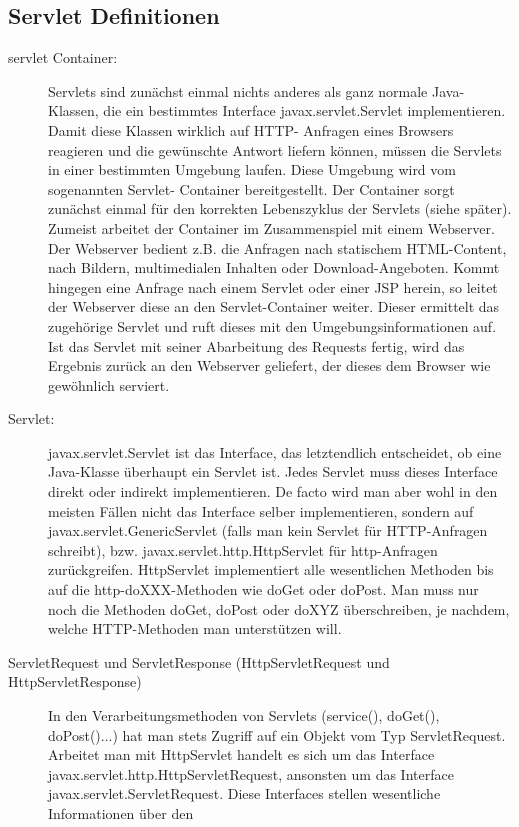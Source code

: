 \documentclass[a4paper,10pt]{scrreprt}
\begin{document}
\subsection{Servlet Definitionen}

\begin{description}
\item [servlet Container:] Servlets sind zunächst einmal nichts anderes als ganz normale Java-Klassen, die ein bestimmtes
Interface javax.servlet.Servlet implementieren. Damit diese Klassen wirklich auf HTTP-
Anfragen eines Browsers reagieren und die gewünschte Antwort liefern können, müssen die
Servlets in einer bestimmten Umgebung laufen. Diese Umgebung wird vom sogenannten Servlet-
Container bereitgestellt.
Der Container sorgt zunächst einmal für den korrekten Lebenszyklus der Servlets (siehe später).
Zumeist arbeitet der Container im Zusammenspiel mit einem Webserver. Der Webserver bedient
z.B. die Anfragen nach statischem HTML-Content, nach Bildern, multimedialen Inhalten oder
Download-Angeboten. Kommt hingegen eine Anfrage nach einem Servlet oder einer JSP herein, so
leitet der Webserver diese an den Servlet-Container weiter. Dieser ermittelt das zugehörige Servlet
und ruft dieses mit den Umgebungsinformationen auf. Ist das Servlet mit seiner Abarbeitung des
Requests fertig, wird das Ergebnis zurück an den Webserver geliefert, der dieses dem Browser wie
gewöhnlich serviert. 
 \item [Servlet:] javax.servlet.Servlet ist das Interface, das letztendlich entscheidet, ob eine Java-Klasse
überhaupt ein Servlet ist. Jedes Servlet muss dieses Interface direkt oder indirekt implementieren.
De facto wird man aber wohl in den meisten Fällen nicht das Interface selber implementieren,
sondern auf javax.servlet.GenericServlet (falls man kein Servlet für HTTP-Anfragen
schreibt), bzw. javax.servlet.http.HttpServlet für http-Anfragen zurückgreifen.
HttpServlet implementiert alle wesentlichen Methoden bis auf die http-doXXX-Methoden wie
doGet oder doPost. Man muss nur noch die Methoden doGet, doPost oder doXYZ
überschreiben, je nachdem, welche HTTP-Methoden man unterstützen will.
\item[ServletRequest und ServletResponse (HttpServletRequest und HttpServletResponse)]	In den Verarbeitungsmethoden von Servlets (service(), doGet(), doPost()...) hat man stets
Zugriff auf ein Objekt vom Typ ServletRequest. Arbeitet man mit HttpServlet handelt es sich
um das Interface javax.servlet.http.HttpServletRequest, ansonsten um das Interface
javax.servlet.ServletRequest. Diese Interfaces stellen wesentliche Informationen über den

\end{description}
\end{document}
